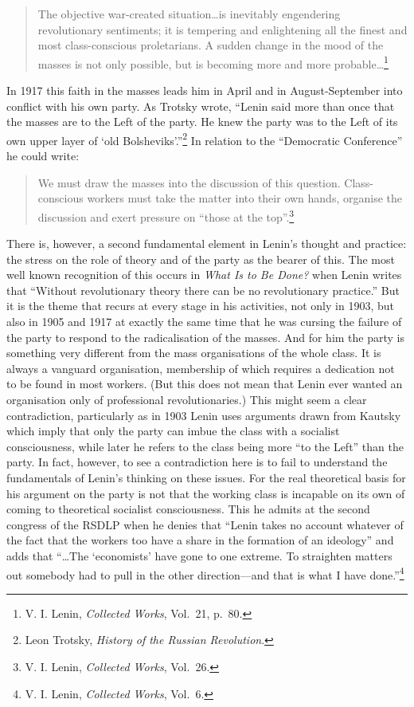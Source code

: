 \blockquote{The objective war-created situation\ldots is inevitably engendering revolutionary sentiments; it is tempering and enlightening all the finest and most class-conscious proletarians. A sudden change in the mood of the masses is not only possible, but is becoming more and more probable\ldots\footnote{V. I. Lenin, \emph{Collected Works}, Vol.~21, p.~80.}}

In 1917 this faith in the masses leads him in April and in August-September into conflict with his own party. As Trotsky wrote, ``Lenin said more than once that the masses are to the Left of the party. He knew the party was to the Left of its own upper layer of `old Bolsheviks'.''\footnote{Leon Trotsky, \emph{History of the Russian Revolution}.} In relation to the ``Democratic Conference'' he could write:

\blockquote{We must draw the masses into the discussion of this question. Class-conscious workers must take the matter into their own hands, organise the discussion and exert pressure on ``those at the top''.\footnote{V. I. Lenin, \emph{Collected Works}, Vol.~26.}}

There is, however, a second fundamental element in Lenin's thought and practice: the stress on the role of theory and of the party as the bearer of this. The most well known recognition of this occurs in \emph{What Is to Be Done?} when Lenin writes that ``Without revolutionary theory there can be no revolutionary practice.'' But it is the theme that recurs at every stage in his activities, not only in 1903, but also in 1905 and 1917 at exactly the same time that he was cursing the failure of the party to respond to the radicalisation of the masses. And for him the party is something very different from the mass organisations of the whole class. It is always a vanguard organisation, membership of which requires a dedication not to be found in most workers. (But this does not mean that Lenin ever wanted an organisation only of professional revolutionaries.) This might seem a clear contradiction, particularly as in 1903 Lenin uses arguments drawn from Kautsky which imply that only the party can imbue the class with a socialist consciousness, while later he refers to the class being more ``to the Left'' than the party. In fact, however, to see a contradiction here is to fail to understand the fundamentals of Lenin's thinking on these issues. For the real theoretical basis for his argument on the party is not that the working class is incapable on its own of coming to theoretical socialist consciousness. This he admits at the second congress of the RSDLP when he denies that ``Lenin takes no account whatever of the fact that the workers too have a share in the formation of an ideology'' and adds that ``\ldots The `economists' have gone to one extreme. To straighten matters out somebody had to pull in the other direction---and that is what I have done.''\footnote{V. I. Lenin, \emph{Collected Works}, Vol.~6.}

